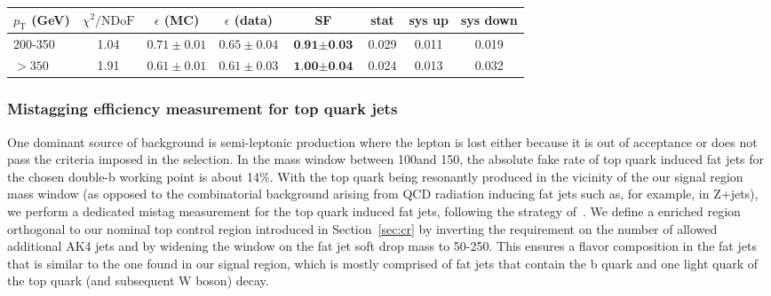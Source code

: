 \begin{table}[htbH]\footnotesize
  \begin{center}
  \label{tab:Doubleb_FitParameters1}
  \begin{tabular}{  l | c  | c | c  | c | c | c | c }
  \hline
  \hline
     $p_\text{T}$ (GeV) & $\chi^2/\text{NDoF}$ & $\epsilon$ (MC) & $\epsilon$ (data) & \textbf{SF} &stat & sys up & sys down\\ \midrule
     \hline
200-350 & 1.04& $0.71\pm0.01$ & $0.65\pm0.04$ &  $\textbf{0.91}\pm\textbf{0.03}$ &  0.029 & 0.011 & 0.019\\ \hline

$>350$ & 1.91 & $0.61\pm0.01$ & $0.61\pm0.03$ & $\textbf{1.00}\pm\textbf{0.04}$ & 0.024 & 0.013 & 0.032\\ \hline
     \hline
     \hline
  \end{tabular}
  \end{center}
\end{table}


\subsubsection{Mistagging efficiency measurement for top quark jets}
\label{mistag_efficiency}

One dominant source of background is semi-leptonic \ttbar production where the lepton is lost either because it is out of acceptance or does not pass the criteria imposed in the selection. In the mass window between 100\GeV and 150\GeV, the absolute fake rate of top quark induced fat jets for the chosen double-b working point is about 14\%. With the top quark being resonantly produced in the vicinity of the our signal region mass window (as opposed to the combinatorial background arising from QCD radiation inducing fat jets such as, for example, in Z+jets), we perform a dedicated mistag measurement for the top quark induced fat jets, following the strategy of~\cite{CMS-PAS-BTV-15-002}. We define a \ttbar enriched region orthogonal to our nominal top control region introduced in Section~\ref{sec:cr} by inverting the requirement on the number of allowed additional AK4 jets and by widening the window on the fat jet soft drop mass to 50-250\GeV. This ensures a flavor composition in the fat jets that is similar to the one found in our signal region, which is mostly comprised of fat jets that contain the b quark and one light quark of the top quark (and subsequent W boson) decay.


